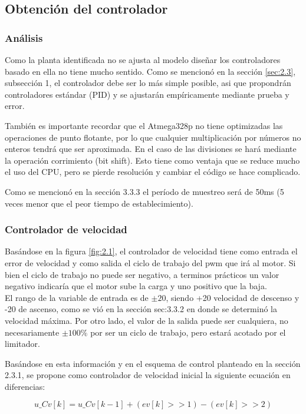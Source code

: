 \subsection{Obtención del controlador}
\subsubsection{Análisis}
Como la planta identificada no se ajusta al modelo diseñar los controladores basado en ella no tiene mucho sentido. Como se mencionó en la sección \ref{sec:2.3}, subsección 1, el controlador debe ser lo más simple posible, asi que propondrán controladores estándar (PID) y se ajustarán empíricamente mediante prueba y error.

También es importante recordar que el Atmega328p no tiene optimizadas las operaciones de punto flotante, por lo que cualquier multiplicación por números no enteros tendrá que ser aproximada. En el caso de las divisiones se hará mediante la operación corrimiento (bit shift). Esto tiene como ventaja que se reduce mucho el uso del CPU, pero se pierde resolución y cambiar el código se hace complicado.

Como se mencionó en la sección 3.3.3 el período de muestreo será de 50ms (5 veces menor que el peor tiempo de establecimiento).

\subsubsection{Controlador de velocidad}
Basándose en la figura \ref{fig:2.1}, el controlador de velocidad tiene como entrada el error de velocidad y como salida el ciclo de trabajo del pwm que irá al motor. Si bien el ciclo de trabajo no puede ser negativo, a terminos prácticos un valor negativo indicaría que el motor sube la carga y uno positivo que la baja.\\
El rango de la variable de entrada es de \(\pm 20\), siendo +20 velocidad de descenso y -20 de ascenso, como se vió en la sección sec:3.3.2 en donde se determinó la velocidad máxima. Por otro lado, el valor de la salida puede ser cualquiera, no necesariamente \(\pm 100\% \) por ser un ciclo de trabajo, pero estará acotado por el limitador.

Basándose en esta información y en el esquema de control planteado en la sección 2.3.1, se propone como controlador de velocidad inicial la siguiente ecuación en diferencias:

\[u\_Cv[k] = u\_Cv[k-1] + (ev[k] >> 1) - (ev[k] >> 2)\]

